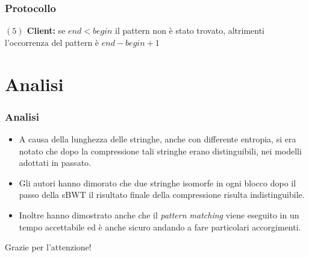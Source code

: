 \documentclass{beamer}
\begin{document}
\begin{frame}
\frametitle{Protocollo}
\textbf{$(5)$ Client:} se $end < begin$ il pattern non è stato trovato, altrimenti l'occorrenza del pattern è $end - begin +1$
\end{frame}
\section{Analisi}
\begin{frame}
\frametitle{Analisi}
\begin{itemize}
	\item A causa della lunghezza delle stringhe, anche con differente entropia, si era notato che dopo la compressione tali stringhe erano distinguibili, nei modelli adottati in passato.\pause
	\item Gli autori hanno dimorato che  due stringhe isomorfe in ogni blocco dopo il passo della sBWT il risultato finale della compressione risulta indistinguibile.\pause
	\item Inoltre hanno dimostrato anche che il \textit{pattern matching} viene eseguito in un tempo accettabile ed è anche sicuro andando a fare particolari accorgimenti. 
\end{itemize}
\end{frame}

\begin{frame}
	\centering
	\large{Grazie per l'attenzione!}
\end{frame}
\end{document}
